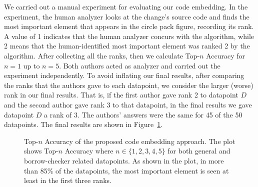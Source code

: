 We carried out a manual experiment for evaluating our code embedding. In the experiment, the human analyzer looks at the change's source code and finds the most important element that appears in the circle pack figure, recording its rank. A value of 1 indicates that the human analyzer concurs with the algorithm, while 2 means that the human-identified most important element was ranked 2 by the algorithm. After collecting all the ranks, then we calculate Top-$n$ Accuracy for $n=1$ up to $n=5$. Both authors acted as analyzer and carried out the experiment independently. To avoid inflating our final results, after comparing the ranks that the authors gave to each datapoint, we consider the larger (worse) rank in our final results. That is, if the first author gave rank 2 to datapoint $D$ and the second author gave rank 3 to that datapoint, in the final results we gave datapoint $D$ a rank of 3. The authors' answers were the same for 45 of the 50 datapoints. The final results are shown in Figure~\ref{fig:rq1}.

\begin{figure}[h]
\centering

\caption{\label{fig:rq1} Top-$n$ Accuracy of the proposed code embedding approach. The plot shows Top-$n$ Accuracy where $n\in\{1,2,3,4,5\}$ for both general and borrow-checker related datapoints. As shown in the plot, in more than 85\% of the datapoints, the most important element is seen at least in the first three ranks.}

\end{figure}


